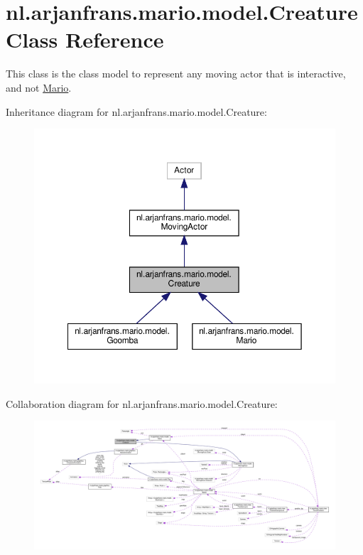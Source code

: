 \hypertarget{classnl_1_1arjanfrans_1_1mario_1_1model_1_1Creature}{}\section{nl.\+arjanfrans.\+mario.\+model.\+Creature Class Reference}
\label{classnl_1_1arjanfrans_1_1mario_1_1model_1_1Creature}


This class is the class model to represent any moving actor that is interactive, and not \hyperlink{classnl_1_1arjanfrans_1_1mario_1_1model_1_1Mario}{Mario}.  




Inheritance diagram for nl.\+arjanfrans.\+mario.\+model.\+Creature\+:
\nopagebreak
\begin{figure}[H]
\begin{center}
\leavevmode
\includegraphics[width=350pt]{classnl_1_1arjanfrans_1_1mario_1_1model_1_1Creature__inherit__graph}
\end{center}
\end{figure}


Collaboration diagram for nl.\+arjanfrans.\+mario.\+model.\+Creature\+:
\nopagebreak
\begin{figure}[H]
\begin{center}
\leavevmode
\includegraphics[width=350pt]{classnl_1_1arjanfrans_1_1mario_1_1model_1_1Creature__coll__graph}
\end{center}
\end{figure}
